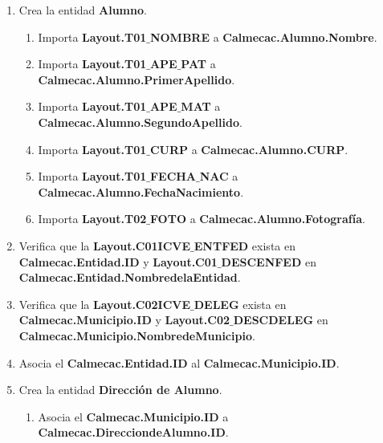\begin{enumerate}
		\begin{enumerate}
	
		\item Crea la entidad \textbf{Alumno}.
		
			\begin{enumerate}
		
			\item Importa \textbf{Layout.T01$\_$NOMBRE} a \textbf{Calmecac.Alumno.Nombre}.
			
			\item Importa \textbf{Layout.T01$\_$APE$\_$PAT} a \textbf{Calmecac.Alumno.PrimerApellido}.
			
			\item Importa \textbf{Layout.T01$\_$APE$\_$MAT} a \textbf{Calmecac.Alumno.SegundoApellido}.
			
			\item Importa \textbf{Layout.T01$\_$CURP} a \textbf{Calmecac.Alumno.CURP}.
			
			\item Importa \textbf{Layout.T01$\_$FECHA$\_$NAC} a \textbf{Calmecac.Alumno.FechaNacimiento}.
			
			\item Importa \textbf{Layout.T02$\_$FOTO} a \textbf{Calmecac.Alumno.Fotografía}.
		
			\end{enumerate}
		
		\item Verifica que la \textbf{Layout.C01ICVE$\_$ENTFED} exista en \textbf{Calmecac.Entidad.ID} y \textbf{Layout.C01$\_$DESCENFED} en \textbf{Calmecac.Entidad.NombredelaEntidad}. 
		
		\item Verifica que la \textbf{Layout.C02ICVE$\_$DELEG} exista en \textbf{Calmecac.Municipio.ID} y \textbf{Layout.C02$\_$DESCDELEG} en \textbf{Calmecac.Municipio.NombredeMunicipio}. 
		
		\item Asocia el \textbf{Calmecac.Entidad.ID} al \textbf{Calmecac.Municipio.ID}.
		
		\item Crea la entidad \textbf{Dirección de Alumno}.
		
			\begin{enumerate}
				
			\item Asocia el \textbf{Calmecac.Municipio.ID} a \textbf{Calmecac.DirecciondeAlumno.ID}.
		

\end{enumerate}
\end{enumerate}
\end{enumerate}
